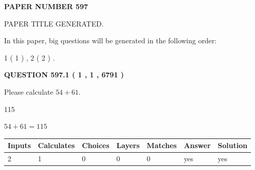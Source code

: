 \documentclass[12pt]{article}
\begin{document}
   
 {\textbf{ \Large{ PAPER NUMBER  597  }}}
   
   
\vspace{0.2in}
   
   
   
   
   
   
   
   
 \vspace{0.2in}
 
 
 
 
   
   
 PAPER TITLE GENERATED.
   
   
   
\vspace{0.2in}
   
In this paper, big questions will be generated in the following order: 
   
   
   1 ( 1 )
 ,
   2 ( 2 )
 .
  
\vspace{0.2in}
  
{\textbf{\Large{QUESTION
597.1 
 ( 1 , 1 , 6791 )
}}}
  
  
 
Please calculate $ %
54 +  %
61 $.
 
 
 
\noindent{}
 
 

115
 
 
\noindent{}
 
 

 
 
 
\noindent{}
 
 

$ %
54 +  %
61=   %
115$
 
 
\noindent{}
 
 

 
   
   
   
   
\noindent\begin{tabular}{|l|l|l|l|l|l|l|}
 \hline
Inputs & Calculates & Choices & Layers & Matches & Answer & Solution \\ \hline
 2  & 
 1  & 
 0
  & 
 0  & 
 0  & 
  yes & 
  yes 
  \\ \hline
 \end{tabular}
   
\end{document}
